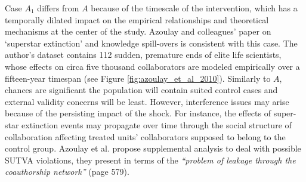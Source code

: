 \documentclass[11pt]{article}
\begin{document}
\begin{refsection}
\vspace{2em}

Case $A_{1}$ differs from $A$ because of the timescale of the intervention,
which has a temporally dilated impact on the empirical relationships and 
theoretical mechanisms at the center of the study. Azoulay and colleagues'
\autocite*{azoulay_et_al_2010} paper on `superstar extinction' and knowledge
spill-overs is consistent with this case. The author's dataset contains 112
sudden, premature ends of elite life scientists, whose effects on circa five
thousand collaborators are modeled empirically over a fifteen-year timespan
(see Figure \ref{fig:azoulay_et_al_2010}). Similarly to $A$, chances are
significant the population will contain suited control cases and external
validity concerns will be least. However, interference issues may arise because
of the persisting impact of the shock.  For instance, the effects of super-star
extinction events may propagate over time through the social structure of
collaboration affecting treated units' collaborators supposed
to belong to the control group. Azoulay et al.  \autocite*{azoulay_et_al_2010}
propose supplemental analysis to deal with possible SUTVA violations, they
present in terms of the \textit{``problem of leakage through the coauthorship
network''} (page 579).


\end{refsection}
\end{document}
